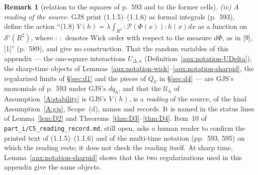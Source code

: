 \documentclass[11pt,a4paper]{article}
\theoremstyle{plain}
\theoremstyle{definition}
\theoremstyle{plain}
\theoremstyle{definition}
\newtheorem{auxrem}[auxlemma]{Remark}
\newcommand{\Uc}{\mathcal U}
\begin{document}
\begin{auxrem}[relation to the squares of p.~593 and to the former cells]
\emph{(iv) A reading of the source.}  GJS print (1.1.5)--(1.1.6) as formal integrals (p.~593),
define the action ``(1.8) $V(h)=\lambda\int_{R^2}:\mathscr P(\Phi(x)):h(x)dx$ as a function on
$\mathscr S'(R^2)$, where $:\ :$ denotes Wick order with respect to the measure $d\Phi$, as in
[9], [1]'' (p.~589), and give no construction.  That the random variables of this appendix --- the
one-square interactions $U_{\Delta,n}$ (Definition~\ref{aux:notation-UDelta}), the sharp-time
objects of Lemmas~\ref{aux:notation-wick}--\ref{aux:notation-sharpid}, the regularized limits of
\S\ref{sec:d1} and the pieces of $Q_V$ in \S\ref{sec:d4} --- are GJS's monomials of p.~593 under
GJS's $dq_h$, and that the $\Uc_h$ of Assumption~\ref{A:stability} is GJS's $V(h)$, is a
\emph{reading} of the source, of the kind Assumption~\ref{A:gjs}, Scope~(d), names and
records.  It is named in the status lines of Lemma~\ref{lem:D2} and
Theorems~\ref{thm:D3}--\ref{thm:D4}.  Item~10 of \texttt{part\_i/C5\_reading\_record.md}, still open, asks a
human reader to confirm the printed text of (1.1.5)--(1.1.6) and of the multi-time notation
(pp.~593, 595) on which the reading rests; it does not check the reading itself.  At sharp time,
Lemma~\ref{aux:notation-sharpid} shows that the two regularizations used in this appendix give the
same objects.
\end{auxrem}
\end{document}
